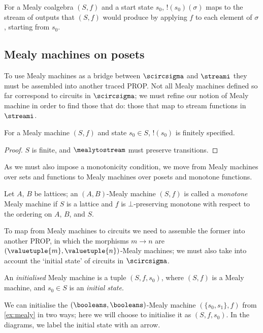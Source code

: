 \documentclass{lmcs}
\begin{document}
For a Mealy coalgebra \((S, f)\) and a start state \(s_0\),
\(!(s_0)(\sigma)\) maps to the stream of outputs that \((S, f)\) would produce
by applying \(f\) to each element of \(\sigma\), starting from \(s_0\).

\subsection{Mealy machines on posets}

To use Mealy machines as a bridge between \(\scircsigma\) and \(\streami\) they
must be assembled into another traced PROP.
Not all Mealy machines defined so far correspond to circuits in
\(\scircsigma\); we must refine our notion of Mealy machine in order to find
those that do: those that map to stream functions in \(\streami\).

\begin{lem}
    For a Mealy machine \((S, f)\) and state \(s_0 \in S\), \(!(s_0)\)
    is finitely specified.
\end{lem}
\begin{proof}
    \(S\) is finite, and \(\mealytostream\) must preserve transitions.
\end{proof}

As we must also impose a monotonicity condition, we move from Mealy machines
over sets and functions to Mealy machines over posets and monotone functions.

\begin{defi}
    Let \(A\), \(B\) be lattices; an \((A,B)\)-Mealy machine
    \((S, f)\) is called a \emph{monotone} Mealy machine if \(S\) is a
    lattice and \(f\) is \(\bot\)-preserving monotone with respect to the
    ordering on \(A\), \(B\), and \(S\).
\end{defi}

To map from Mealy machines to circuits we need to assemble the former into
another PROP, in which the morphisms \(m \to n\) are
\((\valuetuple{m},\valuetuple{n})\)-Mealy machines; we must also take into
account the `initial state' of circuits in \(\scircsigma\).

\begin{defi}
    An \emph{initialised} Mealy machine is a tuple \((S, f, s_0)\), where
    \((S, f)\) is a Mealy machine, and \(s_0 \in S\) is an \emph{initial state}.
\end{defi}

\begin{exa}\label{ex:mealy-init}
    We can initialise the \((\booleans,\booleans)\)-Mealy machine
    \((\{s_0,s_1\},f)\) from \autoref{ex:mealy} in two ways; here we will choose to
    initialise it as \((S,f,s_0)\).
    In the diagrams, we label the initial state with an arrow.
    \begin{center}
        
    \end{center}
\end{exa}
\end{document}
